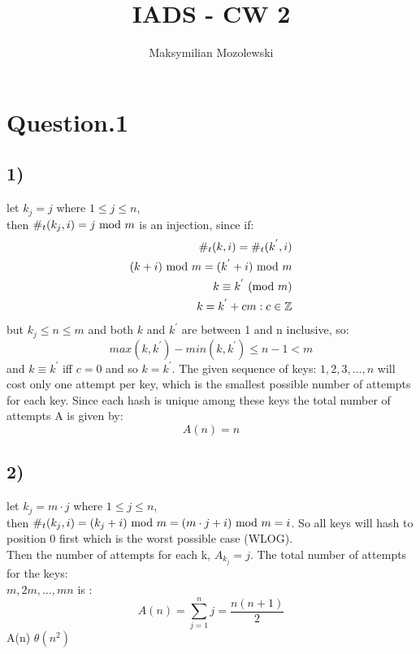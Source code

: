 \documentclass{report}
\begin{document}
\title{IADS - CW 2}
\author{Maksymilian Mozolewski}
\maketitle
\pagebreak

\section*{Question.1}
\subsection*{1)}
let $k_{j} = j$ where $ 1 \leq j \leq n$,\medskip\\
then $\#_{t}(k_{j},i) = j \ \mathrm{mod}\ m$ is an injection, since if:
\begin{align*}
    \#_{t}(k,i) = \#_{t}(k^{'},i)\\
    (k + i) \ \mathrm{mod}\ m = (k^{'} + i) \ \mathrm{mod}\ m\\
    k \equiv k^{'} \ (\mathrm{mod}\ m)\\
    k = k^{'} + cm : c \in \mathbb{Z}
\end{align*}
but $k_{j} \leq n \leq m$ and both $k$ and $k^{'}$ are between 1 and n inclusive, so: 
\begin{equation*}
    max(k,k^{'}) - min(k,k^{'}) \leq n-1 < m
\end{equation*}
and $k \equiv k^{'}$ iff  $c = 0$ and so $k = k^{'}$. The given sequence of keys: $1,2,3,\hdots,n$ will cost only one attempt per key, which is the smallest possible number of attempts for each key. Since each hash is unique among these keys the total number of attempts A is given by: 
\begin{equation*}
    A(n) = n
\end{equation*}

\subsection*{2)}

let $k_{j} = m\cdot j$ where $ 1 \leq j \leq n$,\medskip\\
then $\#_{t}(k_{j},i) = (k_{j} + i) \ \mathrm{mod}\ m = (m \cdot j + i) \ \mathrm{mod}\ m = i$. So all keys will hash to position 0 first which is the worst possible case (WLOG).\\
Then the number of attempts for each k, $A_{k_{j}} = j$. The total number of attempts for the keys:\\ $m,2m,\hdots,mn$ is :
\begin{equation*}
    A(n) = \sum_{j=1}^{n} j = \frac{n(n+1)}{2}
\end{equation*}
A(n) \in $\theta(n^{2})$
\end{document}
